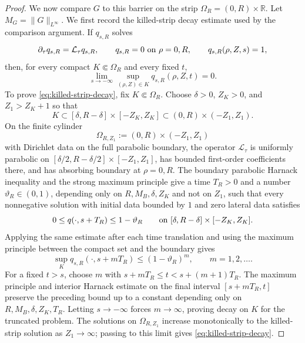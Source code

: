 \begin{proof}
We now compare \(G\) to this barrier on the strip
\(\Omega_R=(0,R)\times\mathbb R\).  Let
\(M_G=\|G\|_{L^\infty}\).  We first record the killed-strip decay estimate used
by the comparison argument.  If \(q_{s,R}\) solves
\[
   \partial_\tau q_{s,R}=\mathcal L_\tau q_{s,R},
   \qquad q_{s,R}=0\hbox{ on }\rho=0,R,
   \qquad q_{s,R}(\rho,Z,s)=1,
\]
then, for every compact \(K\Subset\Omega_R\) and every fixed \(t\),
\begin{equation}\label{eq:killed-strip-decay}
   \lim_{s\to-\infty}\sup_{(\rho,Z)\in K}q_{s,R}(\rho,Z,t)=0 .
\end{equation}
To prove \eqref{eq:killed-strip-decay}, fix \(K\Subset\Omega_R\).  Choose
\(\delta>0\), \(Z_K>0\), and \(Z_1>Z_K+1\) so that
\[
   K\subset [\delta,R-\delta]\times[-Z_K,Z_K]
   \subset (0,R)\times(-Z_1,Z_1).
\]
On the finite cylinder
\[
   \Omega_{R,Z_1}:=(0,R)\times(-Z_1,Z_1)
\]
with Dirichlet data on the full parabolic boundary, the operator
\(\mathcal L_\tau\) is uniformly parabolic on
\([\delta/2,R-\delta/2]\times[-Z_1,Z_1]\), has bounded first-order coefficients
there, and has absorbing boundary at \(\rho=0,R\).  The boundary parabolic
Harnack inequality and the strong maximum principle give a time \(T_R>0\) and a
number \(\vartheta_R\in(0,1)\), depending only on
\(R,M_B,\delta,Z_K\) and not on \(Z_1\), such that every nonnegative solution
with initial data bounded by \(1\) and zero lateral data satisfies
\[
   0\le q(\cdot,s+T_R)\le 1-\vartheta_R
   \qquad\hbox{on }[\delta,R-\delta]\times[-Z_K,Z_K].
\]
Applying the same estimate after each time translation and using the maximum
principle between the compact set and the boundary gives
\[
   \sup_K q_{s,R}(\cdot,s+mT_R)
   \le (1-\vartheta_R)^m,\qquad m=1,2,\dots .
\]
For a fixed \(t>s\), choose \(m\) with
\(s+mT_R\le t<s+(m+1)T_R\).  The maximum principle and interior Harnack estimate
on the final interval \([s+mT_R,t]\) preserve the preceding bound up to a
constant depending only on \(R,M_B,\delta,Z_K,T_R\).  Letting \(s\to-\infty\)
forces \(m\to\infty\), proving decay on \(K\) for the truncated problem.  The
solutions on \(\Omega_{R,Z_1}\) increase monotonically to the killed-strip
solution as \(Z_1\to\infty\); passing to this limit gives
\eqref{eq:killed-strip-decay}.


\end{proof}
